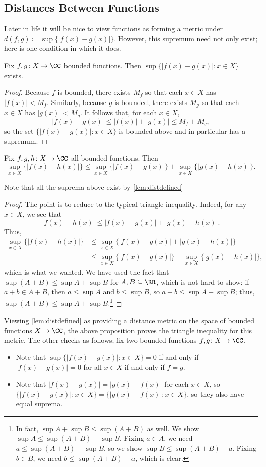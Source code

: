 \subsection{Distances Between Functions}
Later in life it will be nice to view functions as forming a metric under $d(f,g)\coloneqq \sup\{|f(x)-g(x)|\}$. However, this supremum need not only exist; here is one condition in which it does.
\begin{lemma} \label{lem:distdefined}
	Fix $f,g\colon X\to\CC$ bounded functions. Then $\sup\{|f(x)-g(x)|:x\in X\}$ exists.
\end{lemma}
\begin{proof}
	Because $f$ is bounded, there exists $M_f$ so that each $x\in X$ has $|f(x)|<M_f$. Similarly, because $g$ is bounded, there exists $M_g$ so that each $x\in X$ has $|g(x)|<M_g$. It follows that, for each $x\in X$,
	\[|f(x)-g(x)|\le|f(x)|+|g(x)|\le M_f+M_g,\]
	so the set $\{|f(x)-g(x)|:x\in X\}$ is bounded above and in particular has a supremum.
\end{proof}
\begin{proposition}
	Fix $f,g,h\colon X\to\CC$ all bounded functions. Then
	\[\sup_{x\in X}\{|f(x)-h(x)|\}\le\sup_{x\in X}\{|f(x)-g(x)|\}+\sup_{x\in X}\{|g(x)-h(x)|\}.\]
\end{proposition}
Note that all the suprema above exist by \autoref{lem:distdefined}
\begin{proof}
	The point is to reduce to the typical triangle inequality. Indeed, for any $x\in X$, we see that
	\[|f(x)-h(x)|\le|f(x)-g(x)|+|g(x)-h(x)|.\]
	Thus,
	\begin{align*}
		\sup_{x\in X}\{|f(x)-h(x)|\} &\le \sup_{x\in X}\{|f(x)-g(x)|+|g(x)-h(x)|\} \\
		&\le \sup_{x\in X}\{|f(x)-g(x)|\}+\sup_{x\in X}\{|g(x)-h(x)|\},
	\end{align*}
	which is what we wanted. We have used the fact that $\sup(A+B)\le\sup A+\sup B$ for $A,B\subseteq\RR$, which is not hard to show: if $a+b\in A+B$, then $a\le\sup A$ and $b\le\sup B$, so $a+b\le\sup A+\sup B$; thus, $\sup(A+B)\le\sup A+\sup B$.\footnote{In fact, $\sup A+\sup B\le\sup(A+B)$ as well. We show $\sup A\le\sup(A+B)-\sup B$. Fixing $a\in A$, we need $a\le\sup(A+B)-\sup B$, so we show $\sup B\le\sup(A+B)-a$. Fixing $b\in B$, we need $b\le\sup(A+B)-a$, which is clear.}
\end{proof}
\begin{remark}[Nir] \label{rem:metriconfuncs}
	Viewing \autoref{lem:distdefined} as providing a distance metric on the space of bounded functions $X\to\CC$, the above proposition proves the triangle inequality for this metric. The other checks as follows; fix two bounded functions $f,g\colon X\to\CC$.
	\begin{itemize}
		\item Note that $\sup\{|f(x)-g(x)|:x\in X\}=0$ if and only if $|f(x)-g(x)|=0$ for all $x\in X$ if and only if $f=g$.
		\item Note that $|f(x)-g(x)|=|g(x)-f(x)|$ for each $x\in X$, so $\{|f(x)-g(x)|:x\in X\}=\{|g(x)-f(x)|:x\in X\}$, so they also have equal suprema.
	\end{itemize}
\end{remark}
